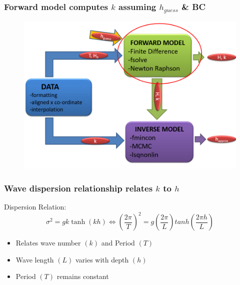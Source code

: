 \documentclass[7pt]{beamer}
\begin{document}
\begin{frame}
 	\frametitle{Forward model computes $k$ assuming $h_{guess}$ \& BC}
		\begin{figure}[H]
	 		\centering
	 		\includegraphics[width=1.0\linewidth]{img/Flow_New.png}
	 	\end{figure}
\end{frame}

\begin{frame}
	\frametitle{Wave dispersion relationship relates $k$ to $h$}
		Dispersion Relation:
		$$ \sigma^2=gk\tanh(kh) \Longleftrightarrow \left(\frac{2\pi}{T}\right)^2 = g\left(\frac{2\pi}{L}\right) tanh \left(\frac{2\pi h}{L}\right)
		$$
		\begin{itemize}
			\item Relates wave number $(k)$ and Period $(T)$
			\item Wave length $(L)$ varies with depth $(h)$
			\item Period $(T)$ remains constant
		\end{itemize}
\end{frame}
\end{document}
